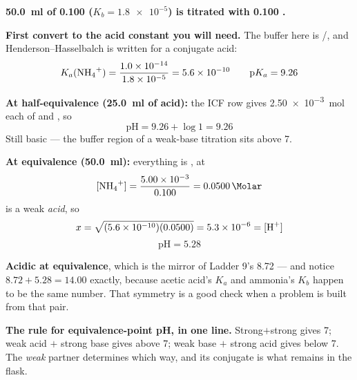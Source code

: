 \documentclass{apchem-worksheet}
\begin{document}
\begin{workedexample}
\textbf{\SI{50.0}{\milli\litre} of \SI{0.100}{\Molar} 
($K_{b} = \num{1.8e-5}$) is titrated with \SI{0.100}{\Molar} .}

\textbf{First convert to the acid constant you will need.} The buffer
here is /, and Henderson--Hasselbalch is written for a
conjugate acid:
\[ K_{a}(\ce{NH4+}) = \frac{\num{1.0e-14}}{\num{1.8e-5}}
   = \num{5.6e-10}
   \qquad
   \text{p}K_{a} = 9.26 \]

\textbf{At half-equivalence (\SI{25.0}{\milli\litre} of acid):} the ICF
row gives \SI{2.50e-3}{\mole} each of  and , so
\[ \text{pH} = 9.26 + \log 1 = \mathbf{9.26} \]
Still basic --- the buffer region of a weak-base titration sits above 7.

\textbf{At equivalence (\SI{50.0}{\milli\litre}):} everything is
, at
\[ [\ce{NH4+}] = \frac{\num{5.00e-3}}{0.100} = \SI{0.0500}{\Molar} \]
 is a weak \emph{acid}, so
\[ x = \sqrt{(\num{5.6e-10})(0.0500)} = \num{5.3e-6} = [\ce{H+}] \]
\[ \text{pH} = \mathbf{5.28} \]

\textbf{Acidic at equivalence}, which is the mirror of Ladder 9's 8.72
--- and notice $8.72 + 5.28 = 14.00$ exactly, because acetic acid's
$K_{a}$ and ammonia's $K_{b}$ happen to be the same number. That
symmetry is a good check when a problem is built from that pair.

\textbf{The rule for equivalence-point pH, in one line.} Strong$+$strong
gives 7; weak acid $+$ strong base gives above 7; weak base $+$ strong
acid gives below 7. The \emph{weak} partner determines which way, and
its conjugate is what remains in the flask.
\end{workedexample}
\end{document}
